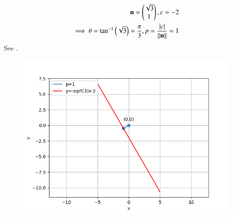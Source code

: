 		\begin{align}
	\mathbf{n}=\begin{pmatrix}\sqrt{3}\\1\end{pmatrix},
			c=-2
			\\
			\implies
			\theta=\tan^{-1}\left(\sqrt{3}\right)
			=\frac{\pi}{3},
			p=\frac{\left\vert c\right\vert}{\left\lVert\mathbf{n}\right\rVert}=1
		\end{align}
See .
\begin{figure}[!htbp]
	\begin{center} 
	    \includegraphics[width=\columnwidth]{chapters/11/10/4/2/figs/line.png}
	\end{center}
\caption{}
\label{fig:chapters/11/10/4/2/Fig1}
\end{figure}

